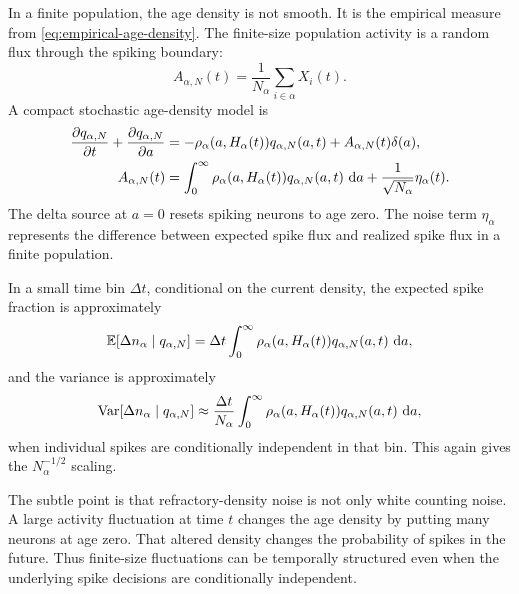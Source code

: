 In a finite population, the age density is not smooth. It is the empirical measure from \cref{eq:empirical-age-density}. The finite-size population activity is a random flux through the spiking boundary:
%
\begin{equation}
  A_{\alpha,N}(t)
  =
  \frac{1}{N_\alpha}\sum_{i\in\alpha}X_i(t).
  \label{eq:finite-size-population-activity-age}
\end{equation}
%
A compact stochastic age-density model is
%
\begin{align}
  \frac{\partial q_{\alpha,N}}{\partial t}
  +
  \frac{\partial q_{\alpha,N}}{\partial a}
  &=
  -\rho_\alpha(a,H_\alpha(t))q_{\alpha,N}(a,t)
  + A_{\alpha,N}(t)\delta(a),
  \label{eq:finite-size-age-density-delta}
  \\
  A_{\alpha,N}(t)
  &=
  \int_0^\infty
  \rho_\alpha(a,H_\alpha(t))q_{\alpha,N}(a,t)\,\mathop{}\!\mathrm{d} a
  +
  \frac{1}{\sqrt{N_\alpha}}\eta_\alpha(t).
  \label{eq:finite-size-age-activity-noise}
\end{align}
%
The delta source at $a=0$ resets spiking neurons to age zero. The noise term $\eta_\alpha$ represents the difference between expected spike flux and realized spike flux in a finite population.

In a small time bin $\Delta t$, conditional on the current density, the expected spike fraction is approximately
%
\begin{equation}
  \mathbb{E}[\Delta n_\alpha\mid q_{\alpha,N}]
  =
  \Delta t
  \int_0^\infty
  \rho_\alpha(a,H_\alpha(t))q_{\alpha,N}(a,t)\,\mathop{}\!\mathrm{d} a,
  \label{eq:expected-spike-fraction-age}
\end{equation}
%
and the variance is approximately
%
\begin{equation}
  \operatorname{Var}[\Delta n_\alpha\mid q_{\alpha,N}]
  \approx
  \frac{\Delta t}{N_\alpha}
  \int_0^\infty
  \rho_\alpha(a,H_\alpha(t))q_{\alpha,N}(a,t)\,\mathop{}\!\mathrm{d} a,
  \label{eq:variance-spike-fraction-age}
\end{equation}
%
when individual spikes are conditionally independent in that bin. This again gives the $N_\alpha^{-1/2}$ scaling.

The subtle point is that refractory-density noise is not only white counting noise. A large activity fluctuation at time $t$ changes the age density by putting many neurons at age zero. That altered density changes the probability of spikes in the future. Thus finite-size fluctuations can be temporally structured even when the underlying spike decisions are conditionally independent.

